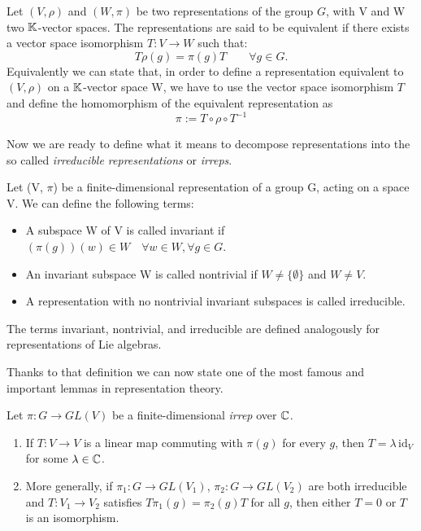 \begin{definition} \label{def:rep-equiv}
	Let $(V, \rho)$ and $(W, \pi)$ be two representations of the group $G$, with V and W two $\mathbb{K}$-vector spaces. The representations are said to be equivalent if there exists a vector space isomorphism $T: V \to W$ such that:
	\[
		T\rho(g) = \pi(g)T \qquad \forall g \in G.
	\]
	Equivalently we can state that, in order to define a representation equivalent to $(V, \rho)$ on a $\mathbb{K}$-vector space W, we have to use the vector space isomorphism $T$ and define the homomorphism of the equivalent representation as
	\[
		\pi := T \circ \rho \circ T^{-1} 
	\]
\end{definition}

Now we are ready to define what it means to decompose representations into the so called \textit{irreducible representations} or \textit{irreps}.

\begin{definition} \label{def:rep-irreps}
	Let (V, $\pi$) be a finite-dimensional representation of a group G, acting on a space V. 
	We can define the following terms:
	\begin{itemize}
	 \item A subspace W of V is called invariant if $(\pi(g))(w) \in W \quad \forall w \in W , \forall g \in G$. 
	 \item An invariant subspace W is called nontrivial if $W \neq \{\emptyset\}$ and $W \neq V$. 
	 \item A representation with no nontrivial invariant subspaces is called irreducible.
	\end{itemize}
	The terms invariant, nontrivial, and irreducible are defined analogously for representations of Lie algebras.
\end{definition}

Thanks to that definition we can now state one of the most famous and important lemmas in representation theory. 

\begin{lemma}\label{lem:schur}
	Let $\pi: G \to GL(V)$ be a finite-dimensional \emph{irrep}  over $\mathbb{C}$.
	\begin{enumerate}
		\item If $T: V \to V$ is a linear map commuting with $\pi(g)$ for every $g$, then $T = \lambda \, \mathrm{id}_V$ for some $\lambda \in \mathbb{C}$.
		\item More generally, if $\pi_1: G\to GL(V_1)$, $\pi_2: G\to GL(V_2)$ are both irreducible and $T: V_1 \to V_2$ satisfies $T\pi_1(g) = \pi_2(g)T$ for all $g$, then either $T=0$ or $T$ is an isomorphism.
	\end{enumerate}
\end{lemma}

